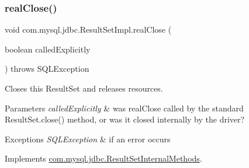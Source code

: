 \subsubsection{\texorpdfstring{real\+Close()}{realClose()}}
{\footnotesize\ttfamily void com.\+mysql.\+jdbc.\+Result\+Set\+Impl.\+real\+Close (\begin{DoxyParamCaption}\item[{boolean}]{called\+Explicitly }\end{DoxyParamCaption}) throws S\+Q\+L\+Exception}

Closes this Result\+Set and releases resources.


\begin{DoxyParams}{Parameters}
{\em called\+Explicitly} & was real\+Close called by the standard Result\+Set.\+close() method, or was it closed internally by the driver?\\
\hline
\end{DoxyParams}

\begin{DoxyExceptions}{Exceptions}
{\em S\+Q\+L\+Exception} & if an error occurs \\
\hline
\end{DoxyExceptions}


Implements \mbox{\hyperlink{interfacecom_1_1mysql_1_1jdbc_1_1_result_set_internal_methods_a04e640b79d91cb9a0eefecf583740187}{com.\+mysql.\+jdbc.\+Result\+Set\+Internal\+Methods}}.

